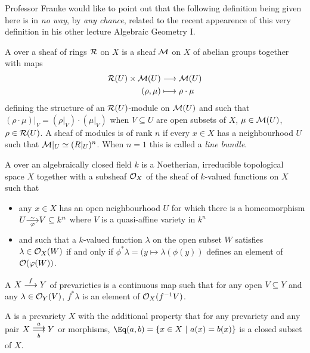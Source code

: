 \documentclass[a4paper,parskip=half,numbers=enddot, DIV=12]{scrreprt}
\begin{document}
Professor Franke would like to point out that the following definition being given here is in \emph{no way}, by \emph{any chance}, related to the recent appearence of this very definition in his other lecture Algebraic Geometry I.

\begin{defi}
    A  over a sheaf of rings $\mathcal{R}$ on $X$ is a sheaf $\mathcal{M}$ on $X$ of abelian groups together with maps 
    \begin{align*}
        \Rr(U) \times \Mm(U) &\morphism \Mm(U)\\
        (\rho,\mu) &\longmapsto \rho\cdot\mu
    \end{align*}
    defining the structure of an $\mathcal{R}(U)$-module on $\mathcal{M}(U)$ and such that $(\rho\cdot \mu)|_V = (\rho|_V)\cdot (\mu|_V)$ when $V\subseteq U$ are open subsets of $X$, $\mu\in \mathcal{M}(U)$, $\rho \in \mathcal{R}(U)$. A sheaf of modules is  of rank $n$ if every $x\in X$ has a neighbourhood $U$ such that $\mathcal{M}|_U\simeq(R|_U)^n$. When $n=1$ this is called a \emph{line bundle}.
\end{defi}
\begin{defi}[Prevariety]
    A  over an algebraically closed field $k$ is a Noetherian, irreducible topological space $X$ together with a subsheaf $\mathcal{O}_X$ of the sheaf of $k$-valued functions on $X$ such that 
    \begin{itemize}
    	\item any $x\in X$ has an open neighbourhood $U$ for which there is a homeomorphism $U\smash{\isomorphism[\phi]} V\subseteq k^n$ where $V$ is a quasi-affine variety in $k^n$
    	\item and such that a $k$-valued function $\lambda$ on the open subset $W$ satisfies $\lambda \in \mathcal{O}_X(W)$ if and only if $\phi^*\lambda = (y\mapsto \lambda(\phi(y))$ defines an element of $\mathcal{O}(\varphi(W))$. 
    \end{itemize}
    
    A  $X\morphism[f] Y$ of prevarieties is a continuous map such that for any open $V\subseteq Y$ and any $\lambda \in\mathcal{O}_Y(V)$, $f^*\lambda$ is an element of $\mathcal{O}_X(f^{-1}V)$.
    
    A  is a prevariety $X$ with the additional property that for any prevariety and any pair $X\doublemorphism[a][b] Y$ or morphisms, $\Eq(a,b) = \left\{x\in X\st a(x) = b(x)\right\}$ is a closed subset of $X$.
\end{defi}
\end{document}
